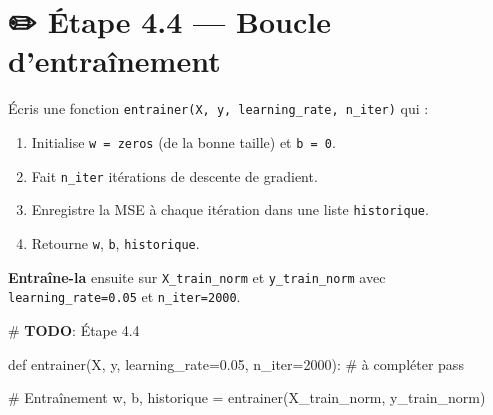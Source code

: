 \documentclass[
  french,
  11pt,
  a4paper,
]{scrbook}
\newenvironment{Shaded}{}{}
\newcommand{\AlertTok}[1]{\textcolor[rgb]{1.00,0.33,0.33}{\textbf{#1}}}
\newcommand{\CommentTok}[1]{\textcolor[rgb]{0.42,0.45,0.49}{#1}}
\newcommand{\ControlFlowTok}[1]{\textcolor[rgb]{0.84,0.23,0.29}{#1}}
\newcommand{\DecValTok}[1]{\textcolor[rgb]{0.00,0.36,0.77}{#1}}
\newcommand{\FloatTok}[1]{\textcolor[rgb]{0.00,0.36,0.77}{#1}}
\newcommand{\KeywordTok}[1]{\textcolor[rgb]{0.84,0.23,0.29}{#1}}
\newcommand{\NormalTok}[1]{\textcolor[rgb]{0.14,0.16,0.18}{#1}}
\newcommand{\OperatorTok}[1]{\textcolor[rgb]{0.14,0.16,0.18}{#1}}
\providecommand{\tightlist}{%
  \setlength{\itemsep}{0pt}\setlength{\parskip}{0pt}}
\begin{document}
\section{✏️ Étape 4.4 --- Boucle
d'entraînement}\label{uxe9tape-4.4-boucle-dentrauxeenement}

\begin{tcolorbox}[enhanced jigsaw, arc=.35mm, bottomrule=.15mm, bottomtitle=1mm, breakable, colback=white, colbacktitle=quarto-callout-note-color!10!white, colframe=quarto-callout-note-color-frame, coltitle=black, left=2mm, leftrule=.75mm, opacityback=0, opacitybacktitle=0.6, rightrule=.15mm, title={📝 À faire}, titlerule=0mm, toprule=.15mm, toptitle=1mm]

Écris une fonction \texttt{entrainer(X,\ y,\ learning\_rate,\ n\_iter)}
qui :

\begin{enumerate}
\def\labelenumi{\arabic{enumi}.}
\tightlist
\item
  Initialise \texttt{w\ =\ zeros} (de la bonne taille) et
  \texttt{b\ =\ 0}.
\item
  Fait \texttt{n\_iter} itérations de descente de gradient.
\item
  Enregistre la MSE à chaque itération dans une liste
  \texttt{historique}.
\item
  Retourne \texttt{w}, \texttt{b}, \texttt{historique}.
\end{enumerate}

\textbf{Entraîne-la} ensuite sur \texttt{X\_train\_norm} et
\texttt{y\_train\_norm} avec \texttt{learning\_rate=0.05} et
\texttt{n\_iter=2000}.

\end{tcolorbox}

\begin{Shaded}
\begin{Highlighting}[]
\CommentTok{\# }\AlertTok{TODO}\CommentTok{: Étape 4.4}

\KeywordTok{def}\NormalTok{ entrainer(X, y, learning\_rate}\OperatorTok{=}\FloatTok{0.05}\NormalTok{, n\_iter}\OperatorTok{=}\DecValTok{2000}\NormalTok{):}
    \CommentTok{\# à compléter}
    \ControlFlowTok{pass}

\CommentTok{\# Entraînement}
\NormalTok{w, b, historique }\OperatorTok{=}\NormalTok{ entrainer(X\_train\_norm, y\_train\_norm)}
\end{Highlighting}
\end{Shaded}
\end{document}
